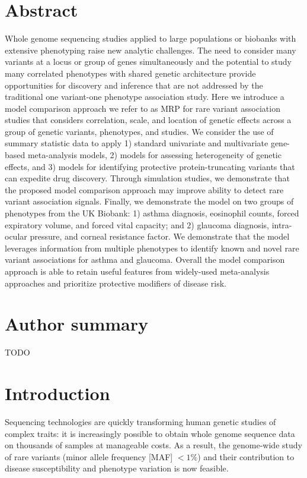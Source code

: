 \section*{Abstract}
Whole genome sequencing studies applied to large populations or biobanks with extensive phenotyping raise new analytic challenges. The need to consider many variants at a locus or group of genes simultaneously and the potential to study many correlated phenotypes with shared genetic architecture provide opportunities for discovery and inference that are not addressed by the traditional one variant-one phenotype association study. Here we introduce a model comparison approach we refer to as MRP for rare variant association studies that considers correlation, scale, and location of genetic effects across a group of genetic variants, phenotypes, and studies. We consider the use of summary statistic data to apply 1) standard univariate and multivariate gene-based meta-analysis models, 2) models for assessing heterogeneity of genetic effects, and 3) models for identifying protective protein-truncating variants that can expedite drug discovery.  Through simulation studies, we demonstrate that the proposed model comparison approach may improve ability to detect rare variant association signals. Finally, we demonstrate the model on two groups of phenotypes from the UK Biobank: 1) asthma diagnosis, eosinophil counts, forced expiratory volume, and forced vital capacity; and 2) glaucoma diagnosis, intra-ocular pressure, and corneal resistance factor. We demonstrate that the model leverages information from multiple phenotypes to identify known and novel rare variant associations for asthma and glaucoma. Overall the model comparison approach is able to retain useful features from widely-used meta-analysis approaches and prioritize protective modifiers of disease risk.

\section*{Author summary}
TODO

\linenumbers

\section*{Introduction}
Sequencing technologies are quickly transforming human genetic studies of complex traits: it is increasingly possible to obtain whole genome sequence data on thousands of samples at manageable costs. As a result, the genome-wide study of rare variants (minor allele frequency [MAF] $< 1\%$) and their contribution to disease susceptibility and phenotype variation is now feasible\cite{ifih1,altshuler2010map,rivas2011deep,10002012integrated}. 

